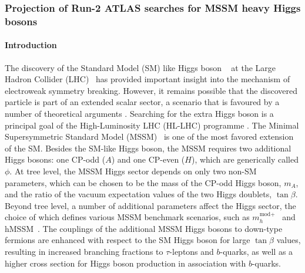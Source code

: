 \usepackage[inline,shortlabels]{enumitem}

\usepackage{\main/section9/atlas_htautau/mssmtautau-defs}

\subsubsection{Projection of Run-2 ATLAS searches for MSSM heavy Higgs bosons}
\paragraph{Introduction}
\label{sec:intro}

The discovery of the Standard Model (SM) like Higgs boson ~\cite{ATLASHiggsJuly2012, CMSHiggsJuly2012}
at the Large Hadron Collider (LHC)~\cite{LHC} has provided important insight into the mechanism of 
electroweak symmetry breaking. However, it remains possible that the discovered particle is part 
of an extended scalar sector, a scenario that is favoured by a number of theoretical arguments 
\cite{Djouadi:2005gj,Branco:2011iw}. Searching for the extra Higgs boson is a principal goal of 
the High-Luminosity LHC (HL-LHC) programme \cite{ecfa15}. The Minimal Supersymmetric Standard 
Model (MSSM)~\cite{Djouadi:2005gj,Fayet:1976et,Fayet:1977yc} is one of the most favored extension 
of the SM. Besides the SM-like Higgs boson, the MSSM requires two additional Higgs bosons: 
one CP-odd ($A$) and one CP-even ($H$), which are generically called $\phi$. 
At tree level, the MSSM Higgs sector depends on only two non-SM parameters, which can be chosen 
to be the mass of the CP-odd Higgs boson, $m_A$, and the ratio of the vacuum expectation values 
of the two Higgs doublets, $\tan\beta$. Beyond tree level, a number of additional parameters 
affect the Higgs sector, the choice of which defines various MSSM benchmark scenarios, such as 
$m_{h}^{\text{mod}+}$~\cite{MSSMBenchmarks} and hMSSM~\cite{Djouadi:2013uqa,Bagnaschi:2015hka}.  
The couplings of the additional MSSM Higgs bosons to down-type fermions are enhanced with respect to 
the SM Higgs boson for large $\tan\beta$ values, resulting in increased branching fractions to 
$\tau$-leptons and $b$-quarks, as well as a higher cross section for Higgs boson production
in association with $b$-quarks.

